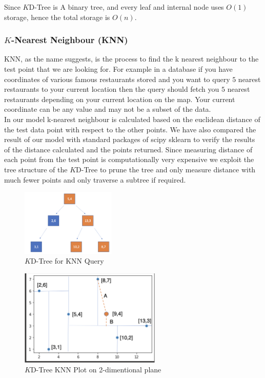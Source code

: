 Since $K$D-Tree is A binary tree, and every leaf and internal node uses $O(1)$ storage, hence the total storage is $O(n)$.

\subsubsection{$K$-Nearest Neighbour (KNN)}

    KNN, as the name suggests, is the process to find the k nearest neighbour to the test point that we are looking for. For example in a database if you have coordinates of various famous restaurants stored and you want to query $5$ nearest restaurants to your current location then the query should fetch you $5$ nearest restaurants depending on your current location on the map. Your current coordinate can be any value and may not be a subset of the data.\\

    In our model k-nearest neighbour is calculated based on the euclidean distance of the test data point with respect to the other points. We have also compared the result of our model with standard packages of scipy sklearn to verify the results of the distance calculated and the points returned. Since measuring distance of each point from the test point is computationally very expensive we exploit the tree structure of the $K$D-Tree to prune the tree and only measure distance with much fewer points and only traverse a subtree if required.\\

\begin{figure}[htp]
    \centering
    \includegraphics[width=0.4\textwidth]{graphs/KD-Tree_KNN_Tree.png}
    \caption{$K$D-Tree for KNN Query}
    \label{fig:$K$D-Tree_for_KNN Query}
\end{figure}

\begin{figure}[htp]
    \centering
    \includegraphics[width=0.6\textwidth]{graphs/KD-Tree_KNN_plot.png}
    \caption{$K$D-Tree KNN Plot on 2-dimentional plane}
    \label{fig:KD_Tree_KNN_Plot}
\end{figure}


